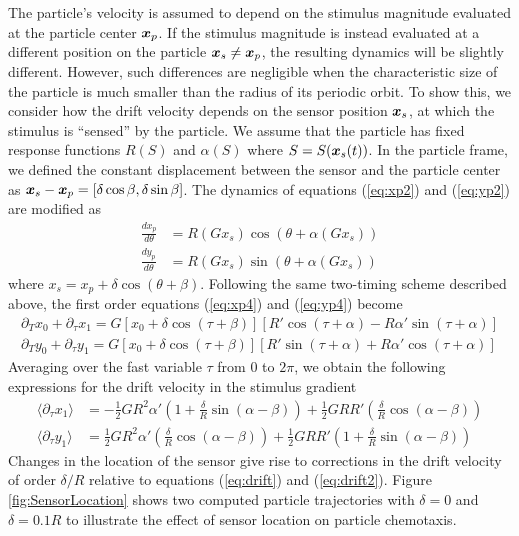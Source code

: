 \begin{appendices}
The particle's velocity is assumed to depend on the stimulus magnitude evaluated at the particle center $\boldsymbol{x}_p$.  If the stimulus magnitude is instead evaluated at a different position on the particle $\boldsymbol{x}_s\neq \boldsymbol{x}_p$, the resulting dynamics will be slightly different.  However, such differences are negligible when the characteristic size of the particle is much smaller than the radius of its periodic orbit.  To show this, we consider how the drift velocity depends on the sensor position $\boldsymbol{x}_s$, at which the stimulus is ``sensed'' by the particle.  We assume that the particle has fixed response functions $R(S)$ and $\alpha(S)$ where $S = S(\boldsymbol{x}_s(t))$. In the particle frame, we defined the constant displacement between the sensor and the particle center as $\boldsymbol{x}_s-\boldsymbol{x}_p =[\delta \cos\beta, \delta \sin\beta]$.  The dynamics of equations (\ref{eq:xp2}) and (\ref{eq:yp2}) are modified as
\begin{align}
    \frac{d x_p}{d\theta} &= R(G x_s ) \cos(\theta + \alpha(G x_s))   
    \\ 
    \frac{d y_p}{d\theta} &= R(G x_s) \sin(\theta + \alpha(G x_s))
\end{align}	
where $x_s = x_p + \delta  \cos( \theta +\beta)$.  Following the same two-timing scheme described above, the first order equations (\ref{eq:xp4}) and (\ref{eq:yp4}) become
\begin{align}
    \partial_T x_0 + \partial_{\tau} x_1 = G \left[ x_0 + \delta \cos(\tau +\beta)\right] \left[ R' \cos(\tau + \alpha) - R \alpha' \sin(\tau + \alpha)\right]
    \\
    \partial_T y_0 + \partial_{\tau} y_1 = G \left[ x_0 + \delta \cos(\tau +\beta)\right] \left[ R' \sin(\tau + \alpha) + R \alpha' \cos(\tau + \alpha)\right]
\end{align}
Averaging over the fast variable $\tau$ from 0 to $2\pi$, we obtain the following expressions for the drift velocity in the stimulus gradient    
\begin{align}
    \langle \partial_{\tau} x_1 \rangle &= -\tfrac{1}{2} G R^2\alpha' \left( 1 + \frac{\delta}{R}\sin(\alpha-\beta) \right) + \tfrac{1}{2} G R R' \left( \frac{\delta}{R} \cos(\alpha-\beta) \right) \label{eq:xdrift2}
    \\
    \langle \partial_{\tau} y_1 \rangle &= \tfrac{1}{2} G R^2\alpha' \left( \frac{\delta}{R} \cos(\alpha-\beta) \right) + \tfrac{1}{2} G R R'\left( 1 + \frac{\delta}{R}\sin(\alpha-\beta) \right) \label{eq:ydrift2}
\end{align}
Changes in the location of the sensor give rise to corrections in the drift velocity of order $\delta/R$ relative to equations (\ref{eq:drift}) and (\ref{eq:drift2}).  Figure \ref{fig:SensorLocation} shows two computed particle trajectories with $\delta=0$ and $\delta = 0.1 R$ to illustrate the effect of sensor location on particle chemotaxis.

\end{appendices}
